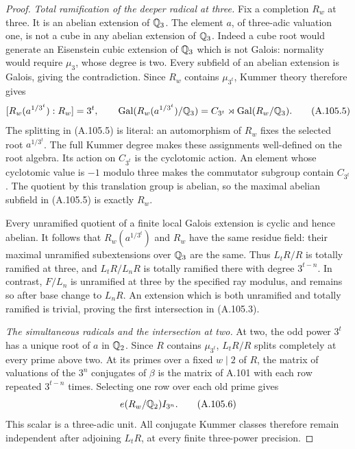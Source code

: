 \begin{proof}
\emph{Total ramification of the deeper radical at three.}
Fix a completion $R_w$ at three.
It is an abelian extension of $\mathbb Q_3$.
The element $a$, of three-adic valuation one, is not
a cube in any abelian extension of $\mathbb Q_3$.
Indeed a cube root would generate an Eisenstein
cubic extension of $\mathbb Q_3$ which is not Galois:
normality would require $\mu_3$, whose degree is two.
Every subfield of an abelian extension is Galois,
giving the contradiction.
Since $R_w$ contains $\mu_{3^t}$, Kummer theory
therefore gives
\[
 [R_w(a^{1/3^t}):R_w]=3^t,
 \qquad
 \operatorname{Gal}(R_w(a^{1/3^t})/\mathbb Q_3)
       =C_{3^t}\rtimes\operatorname{Gal}(R_w/\mathbb Q_3).
 \tag{A.105.5}
\]
The splitting in (A.105.5) is literal: an automorphism
of $R_w$ fixes the selected root $a^{1/3^t}$.
The full Kummer degree makes these assignments
well-defined on the root algebra.
Its action on $C_{3^t}$ is the cyclotomic action.
An element whose cyclotomic value is $-1$ modulo three
makes the commutator subgroup contain $C_{3^t}$.
The quotient by this translation group is abelian,
so the maximal abelian subfield in (A.105.5) is exactly
$R_w$.

Every unramified quotient of a finite local Galois
extension is cyclic and hence abelian.
It follows that $R_w(a^{1/3^t})$ and $R_w$ have the
same residue field: their maximal unramified
subextensions over $\mathbb Q_3$ are the same.
Thus $L_tR/R$ is totally ramified at three,
and $L_tR/L_nR$ is totally ramified there with degree
$3^{t-n}$.
In contrast, $F/L_n$ is unramified at three by the
specified ray modulus, and remains so after base
change to $L_nR$.
An extension which is both unramified and totally
ramified is trivial, proving the first intersection
in (A.105.3).

\emph{The simultaneous radicals and the intersection at two.}
At two, the odd power $3^t$ has a unique root of $a$
in $\mathbb Q_2$.
Since $R$ contains $\mu_{3^t}$, $L_tR/R$ splits
completely at every prime above two.
At its primes over a fixed $w\mid2$ of $R$, the
matrix of valuations of the $3^n$ conjugates of
$\beta$ is the matrix of A.101 with each row
repeated $3^{t-n}$ times.
Selecting one row over each old prime gives
\[
                        e(R_w/\mathbb Q_2)I_{3^n}.
 \tag{A.105.6}
\]
This scalar is a three-adic unit.
All conjugate Kummer classes therefore remain
independent after adjoining $L_tR$, at every finite
three-power precision.


\end{proof}
